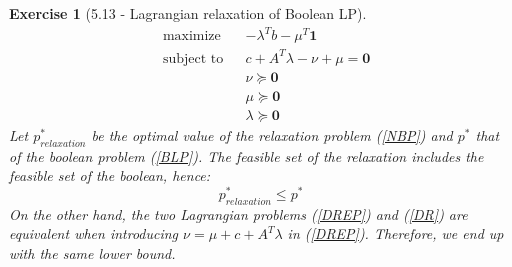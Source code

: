 \documentclass[11pt]{article}
\theoremstyle{exo}
\newtheorem*{exercise}{Exercise}
\newcommand{\1}{\mathbf{1}}
\newcommand{\0}{\mathbf{0}}
\begin{document}
\begin{exercise}[5.13 - Lagrangian relaxation of Boolean LP]
\begin{equation}
\begin{aligned}
& {\text{maximize}} & &-\lambda^Tb-\mu^T\1\\
& \text{subject to} & & c+A^T\lambda-\nu+\mu=\0 \\
& & &\nu\succeq \0\\
& & &\mu\succeq \0\\
& & &\lambda\succeq \0
\end{aligned}
\end{equation}
Let $p^*_{relaxation}$ be the optimal value of the relaxation problem (\ref{NBP}) and $p^*$ that of the boolean problem (\ref{BLP}). 
The feasible set of the relaxation includes the feasible set of the boolean, hence:
\[p^*_{relaxation}\leq p^*\]
On the other hand, the two Lagrangian problems (\ref{DREP}) and (\ref{DR}) are equivalent when introducing $\nu=\mu+c+A^T\lambda$ in (\ref{DREP}). Therefore, we end up with the same lower bound.
\end{exercise}
\end{document}
